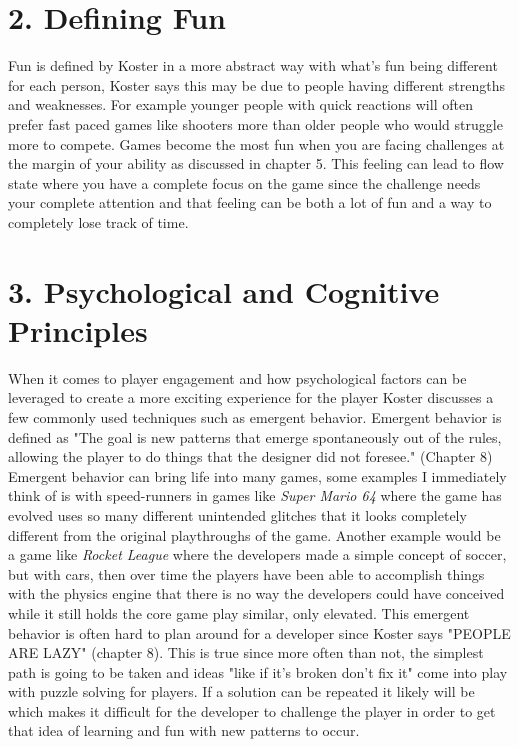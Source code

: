 \documentclass[12pt]{article}
\theoremstyle{definition}
\begin{document}
\section*{2. Defining Fun}
Fun is defined by Koster in a more abstract way with what's fun being different for each person, Koster says this may be due to people having different strengths and weaknesses. For example younger people with quick reactions will often prefer fast paced games like shooters more than older people who would struggle more to compete. Games become the most fun when you are facing challenges at the margin of your ability as discussed in chapter 5. This feeling can lead to flow state where you have a complete focus on the game since the challenge needs your complete attention and that feeling can be both a lot of fun and a way to completely lose track of time.

\section*{3. Psychological and Cognitive Principles}
When it comes to player engagement and how psychological factors can be leveraged to create a more exciting experience for the player Koster discusses a few commonly used techniques such as emergent behavior. Emergent behavior is defined as "The goal is new patterns that emerge spontaneously out of the rules, allowing the player to do things that the designer did not foresee." (Chapter 8) Emergent behavior can bring life into many games, some examples I immediately think of is with speed-runners in games like \textit{Super Mario 64} where the game has evolved uses so many different unintended glitches that it looks completely different from the original playthroughs of the game. Another example would be a game like \textit{Rocket League} where the developers made a simple concept of soccer, but with cars, then over time the players have been able to accomplish things with the physics engine that there is no way the developers could have conceived while it still holds the core game play similar, only elevated. This emergent behavior is often hard to plan around for a developer since Koster says "PEOPLE ARE LAZY" (chapter 8). This is true since more often than not, the simplest path is going to be taken and ideas "like if it's broken don't fix it" come into play with puzzle solving for players. If a solution can be repeated it likely will be which makes it difficult for the developer to challenge the player in order to get that idea of learning and fun with new patterns to occur.
\end{document}
